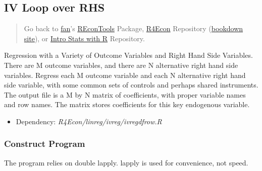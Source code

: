 \documentclass[
]{book}
\providecommand{\tightlist}{%
  \setlength{\itemsep}{0pt}\setlength{\parskip}{0pt}}
\begin{document}
\hypertarget{iv-loop-over-rhs}{%
\subsection{IV Loop over RHS}\label{iv-loop-over-rhs}}

\begin{quote}
Go back to \href{http://fanwangecon.github.io/CodeDynaAsset/}{fan}'s \href{https://fanwangecon.github.io/REconTools/}{REconTools} Package, \href{https://fanwangecon.github.io/R4Econ/}{R4Econ} Repository (\href{https://fanwangecon.github.io/R4Econ/bookdown}{bookdown site}), or \href{https://fanwangecon.github.io/Stat4Econ/}{Intro Stats with R} Repository.
\end{quote}

Regression with a Variety of Outcome Variables and Right Hand Side Variables. There are M outcome variables, and there are N alternative right hand side variables. Regress each M outcome variable and each N alternative right hand side variable, with some common sets of controls and perhaps shared instruments. The output file is a M by N matrix of coefficients, with proper variable names and row names. The matrix stores coefficients for this key endogenous variable.

\begin{itemize}
\tightlist
\item
  Dependency: \emph{R4Econ/linreg/ivreg/ivregdfrow.R}
\end{itemize}

\hypertarget{construct-program-1}{%
\subsubsection{Construct Program}\label{construct-program-1}}

The program relies on double lapply. lapply is used for convenience, not speed.
\end{document}
